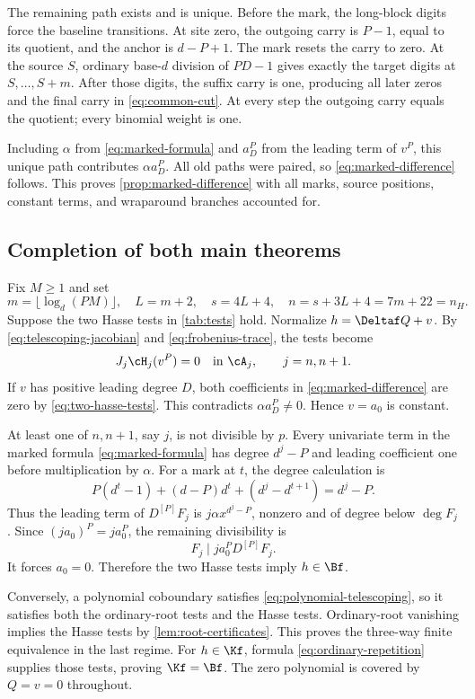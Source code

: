 The remaining path exists and is unique. Before the mark, the
long-block digits force the baseline transitions. At site zero,
the outgoing carry is $P-1$, equal to its quotient, and the
anchor is $d-P+1$. The mark resets the carry to zero.
At the source $S$, ordinary base-$d$ division of $PD-1$ gives
exactly the target digits at $S,\ldots,S+m$. After those digits,
the suffix carry is one, producing all later zeros and the
final carry in \eqref{eq:common-cut}. At every step the outgoing
carry equals the quotient; every binomial weight is one.

Including $\alpha$ from \eqref{eq:marked-formula} and $a_D^P$
from the leading term of $v^P$, this unique path contributes
$\alpha a_D^P$. All old paths were paired, so
\eqref{eq:marked-difference} follows. This proves
\cref{prop:marked-difference} with all marks, source positions,
constant terms, and wraparound branches accounted for.

\subsection{Completion of both main theorems}

Fix $M\ge1$ and set
\[
 m=\lfloor\log_d(PM)\rfloor,\quad L=m+2,\quad
 s=4L+4,\quad n=s+3L+4=7m+22=n_H.
\]
Suppose the two Hasse tests in \cref{tab:tests} hold. Normalize
$h=\Deltaf Q+v$. By \eqref{eq:telescoping-jacobian} and
\eqref{eq:frobenius-trace}, the tests become
\begin{equation}
 J_j\cH_j(v^P)=0\quad\text{in }\cA_j,
                    \qquad j=n,n+1.
 \label{eq:two-hasse-tests}
\end{equation}
If $v$ has positive leading degree $D$, both coefficients
in \eqref{eq:marked-difference} are zero by
\eqref{eq:two-hasse-tests}. This contradicts
$\alpha a_D^P\ne0$. Hence $v=a_0$ is constant.

At least one of $n,n+1$, say $j$, is not divisible by $p$.
Every univariate term in the marked formula
\eqref{eq:marked-formula} has degree $d^j-P$ and leading
coefficient one before multiplication by $\alpha$. For a mark
at $t$, the degree calculation is
\[
 P(d^t-1)+(d-P)d^t+(d^j-d^{t+1})=d^j-P.
\]
Thus the leading term of $D^{[P]}F_j$ is
$j\alpha x^{d^j-P}$, nonzero and of degree below $\deg F_j$.
Since $(ja_0)^P=ja_0^P$, the remaining divisibility is
\[
 F_j\mid ja_0^PD^{[P]}F_j.
\]
It forces $a_0=0$. Therefore the two Hasse tests imply
$h\in\Bf$.

Conversely, a polynomial coboundary satisfies
\eqref{eq:polynomial-telescoping}, so it satisfies both the
ordinary-root tests and the Hasse tests. Ordinary-root vanishing
implies the Hasse tests by \cref{lem:root-certificates}.
This proves the three-way finite equivalence in the last regime.
For $h\in\Kf$, formula \eqref{eq:ordinary-repetition} supplies
those tests, proving $\Kf=\Bf$. The zero polynomial is covered
by $Q=v=0$ throughout.

